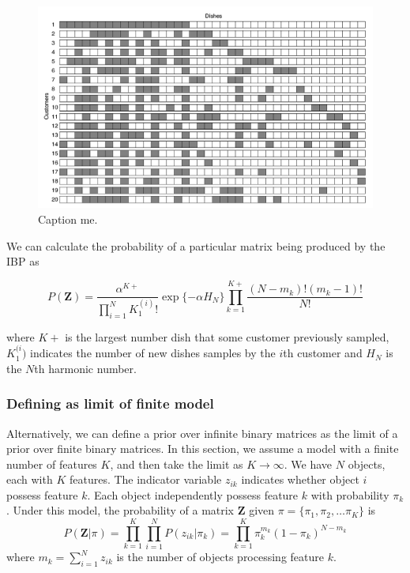 \documentclass[twoside]{article}
\begin{document}
\begin{figure}[h]
  \centering
  \includegraphics[scale=0.35]{ex}
  \caption{Caption me.}
  \label{fig:ex}
\end{figure}

We can calculate the probability of a particular matrix being produced by the IBP as

\begin{equation}
    P(\mathbf{Z}) = \frac{\alpha^{K+}}{\prod_{i = 1}^{N}K_1^{(i)}!} \exp\{-\alpha H_N\} \prod_{k = 1}^{K+} \frac{(N-m_k)!(m_k-1)!}{N!}
    \label{eq:ibp}
\end{equation}

where $K+$ is the largest number dish that some customer previously sampled, $K_1^{(i})$ indicates the number of new dishes samples by the $i$th customer and $H_N$ is the $N$th harmonic number.

\subsubsection{Defining as limit of finite model}
Alternatively, we can define a prior over infinite binary matrices as the limit of a prior over finite binary matrices. In this section, we assume a model with a finite number of features $K$, and then take the limit as $K \to \infty$. We have $N$ objects, each with $K$ features. The indicator variable $z_{ik}$ indicates whether object $i$ possess feature $k$. Each object independently possess feature $k$ with probability $\pi_k$. Under this model, the probability of a matrix $\mathbf{Z}$ given $\pi = \{\pi_1, \pi_2, \dots \pi_K\}$ is
\begin{equation}
    P(\mathbf{Z} | \pi) = \prod_{k = 1}^K \prod_{i = 1}^N P(z_{ik} | \pi_k) = \prod_{k = 1}^K \pi_k^{m_k} (1 - \pi_k)^{N-m_k}
\end{equation}
where $m_k = \sum_{i=1}^N z_{ik}$ is the number of objects processing feature $k$.
\end{document}
